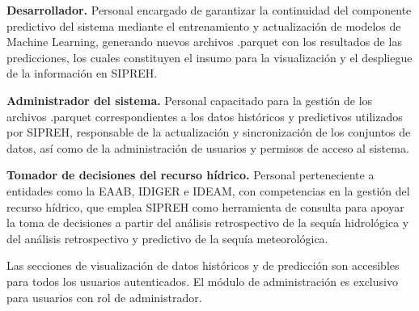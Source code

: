 \begin{definition}
\textbf{Desarrollador.} Personal encargado de garantizar la continuidad del componente predictivo del sistema mediante el entrenamiento y actualización de modelos de Machine Learning, generando nuevos archivos .parquet con los resultados de las predicciones, los cuales constituyen el insumo para la visualización y el despliegue de la información en SIPREH.
\end{definition}

\begin{definition}
\textbf{Administrador del sistema.} Personal capacitado para la gestión de los archivos .parquet correspondientes a los datos históricos y predictivos utilizados por SIPREH, responsable de la actualización y sincronización de los conjuntos de datos, así como de la administración de usuarios y permisos de acceso al sistema.
\end{definition}

\begin{definition}
\textbf{Tomador de decisiones del recurso hídrico.} Personal perteneciente a entidades como la EAAB, IDIGER e IDEAM, con competencias en la gestión del recurso hídrico, que emplea SIPREH como herramienta de consulta para apoyar la toma de decisiones a partir del análisis retrospectivo de la sequía hidrológica y del análisis retrospectivo y predictivo de la sequía meteorológica.
\end{definition}

\begin{remark}
Las secciones de visualización de datos históricos y de predicción son accesibles para todos los usuarios autenticados. El módulo de administración es exclusivo para usuarios con rol de administrador.
\end{remark}
